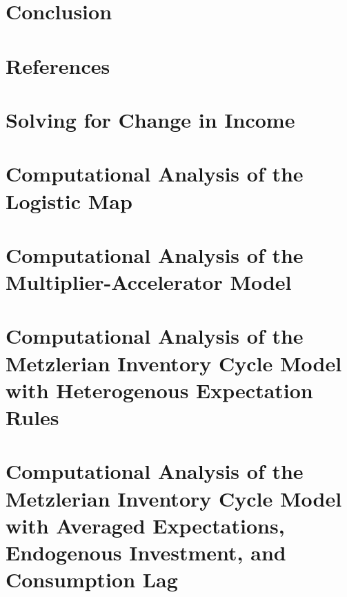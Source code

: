 \documentclass[12pt,twoside]{report}
\begin{document}
\chapter{Conclusion}

\chapter{References}

\begin{appendices}
\chapter{Solving for Change in Income}\label{appendix_growth}

\chapter{Computational Analysis of the Logistic Map}

\chapter{Computational Analysis of the\\ Multiplier-Accelerator Model}

\chapter{Computational Analysis of the Metzlerian Inventory Cycle Model with Heterogenous Expectation Rules}

\chapter{Computational Analysis of the Metzlerian Inventory Cycle Model with Averaged Expectations, Endogenous Investment, and Consumption Lag}
	
\end{appendices}
\end{document}
